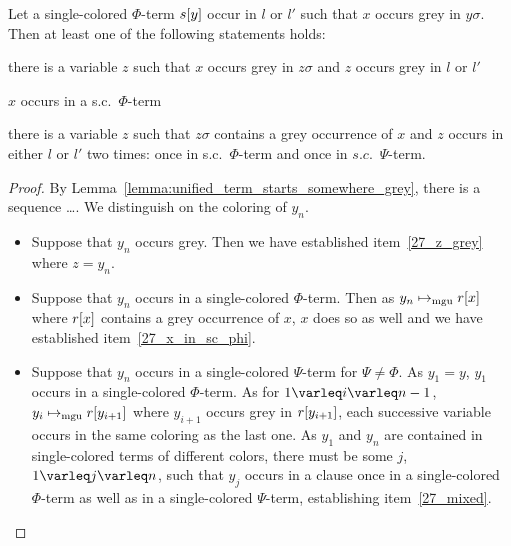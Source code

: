 \documentclass[,%
	draft=false,%
	numbers=noendperiod
	11pt,
	a4paper,
	oneside,%
	openany,
]{memoir}
\begin{document}
\begin{lemma}
	\label{lemma:colored_y_sigma_contains_grey_x}
	Let a single-colored $\Phi$-term $s[y]$ occur in $l$ or $l'$ such that $x$ occurs grey in $y\sigma$.
	Then at least one of the following statements holds:
	\begin{compactenum}
	\item
		there is a variable $z$ such that $x$ occurs grey in $z\sigma$ and $z$ occurs grey in $l$ or $l'$
		\label{27_z_grey}
	\item $x$ occurs in a s.c.\ $\Phi$-term \label{27_x_in_sc_phi}
	\item there is a variable $z$ such that $z\sigma$ contains a grey occurrence of $x$ and $z$ occurs in either $l$ or $l'$ two times: once in s.c.\ $\Phi$-term and once in $s.c.$\ $\Psi$-term.
		\label{27_mixed}

	\end{compactenum}
\end{lemma}
\begin{proof}

	By Lemma~\ref{lemma:unified_term_starts_somewhere_grey}, there is a sequence \dots.
	We distinguish on the coloring of $y_n$.

	\begin{itemize}
		\item Suppose that $y_n$ occurs grey. 
			Then we have established item~\ref{27_z_grey} where $z=y_n$.
		\item 
			Suppose that $y_n$ occurs in a single-colored $\Phi$-term.
			Then as $y_n \mapsto_{\operatorname{mgu}} r[x]$ where $r[x]$ contains a grey occurrence of $x$, $x$ does so as well and we have established item~\ref{27_x_in_sc_phi}.
		\item 
			Suppose that $y_n$ occurs in a single-colored $\Psi$-term for $\Psi \neq \Phi$.
			As $y_1 = y$, $y_1$ occurs in a single-colored $\Phi$-term.
			As for $1 \varleq i \varleq n-1$, $y_i \mapsto_{\operatorname{mgu}} r[y_{i+1}]$ where $y_{i+1}$ occurs grey in  $r[y_{i+1}]$, each successive variable occurs in the same coloring as the last one.
			As $y_1$ and $y_n$ are contained in single-colored terms of different colors, there must be some $j$, $1\varleq j\varleq n$, such that $y_j$ occurs in a clause once in a single-colored $\Phi$-term as well as in a single-colored $\Psi$-term, establishing item~\ref{27_mixed}.
			\qedhere
	\end{itemize}

\end{proof}
\end{document}
